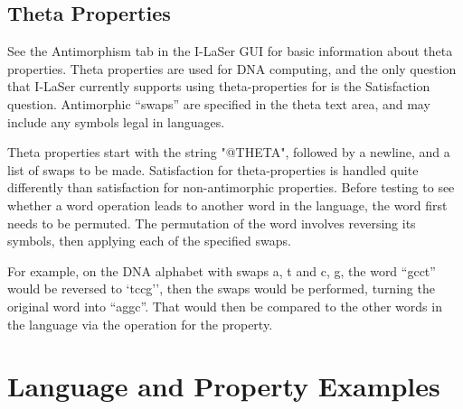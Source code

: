 \documentclass{article}
\begin{document}
\subsection{Theta Properties}
See the Antimorphism tab in the I-LaSer GUI for basic information about theta properties.
Theta properties are used for DNA computing, and the only question that I-LaSer currently supports using theta-properties for is the Satisfaction question.
Antimorphic ``swaps'' are specified in the theta text area, and may include any symbols legal in languages.

Theta properties start with the string "@THETA", followed by a newline, and a list of swaps to be made.
Satisfaction for theta-properties is handled quite differently than satisfaction for non-antimorphic properties.
Before testing to see whether a word operation leads to another word in the language, the word first needs to be permuted.
The permutation of the word involves reversing its symbols, then applying each of the specified swaps.

For example, on the DNA alphabet with swaps {a, t} and {c, g}, the word ``gcct'' would be reversed to `tccg'', then the swaps would be performed, turning the original word into ``aggc''.
That would then be compared to the other words in the language via the operation for the property.
\pagebreak
\section{Language and Property Examples}
\end{document}
